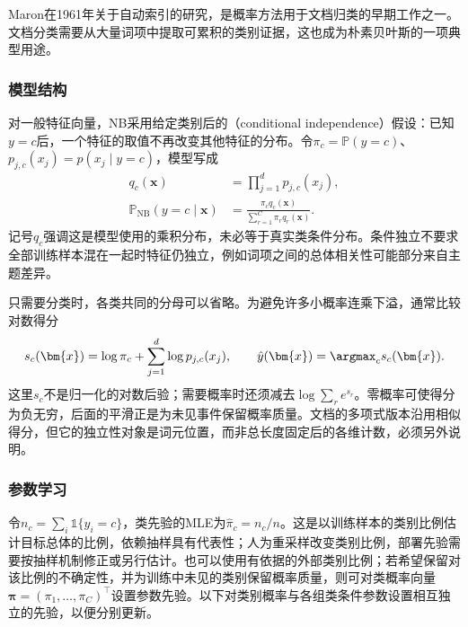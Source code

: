 Maron在1961年关于自动索引的研究，是概率方法用于文档归类的早期工作之一。文档分类需要从大量词项中提取可累积的类别证据，这也成为朴素贝叶斯的一项典型用途。

\subsubsection{模型结构}
\label{sec:classification-naive-bayes-structure}

对一般特征向量，NB采用给定类别后的（conditional independence）假设：已知$y=c$后，一个特征的取值不再改变其他特征的分布。令$\pi_c=\mathbb{P}(y=c)$、$p_{j,c}(x_j)=p(x_j\mid y=c)$，模型写成
\begin{equation}
  \label{eq:classification-naive-bayes-model}
  \begin{aligned}
    q_c(\bm{x})&=\prod_{j=1}^{d}p_{j,c}(x_j),\\
    \mathbb{P}_{\mathrm{NB}}(y=c\mid\bm{x})
      &=\frac{\pi_c q_c(\bm{x})}
      {\sum_{r=1}^{C}\pi_r q_r(\bm{x})}.
  \end{aligned}
\end{equation}
记号$q_c$强调这是模型使用的乘积分布，未必等于真实类条件分布。条件独立不要求全部训练样本混在一起时特征仍独立，例如词项之间的总体相关性可能部分来自主题差异。

只需要分类时，各类共同的分母可以省略。为避免许多小概率连乘下溢，通常比较对数得分
\begin{equation}
  \label{eq:classification-naive-bayes-score}
  s_c(\bm{x})
  =\log\pi_c+\sum_{j=1}^{d}\log p_{j,c}(x_j),
  \qquad
  \hat y(\bm{x})=\argmax_c s_c(\bm{x}).
\end{equation}
这里$s_c$不是归一化的对数后验；需要概率时还须减去$\log\sum_r e^{s_r}$。零概率可使得分为负无穷，后面的平滑正是为未见事件保留概率质量。文档的多项式版本沿用相似得分，但它的独立性对象是词元位置，而非总长度固定后的各维计数，必须另外说明。

\subsubsection{参数学习}
\label{sec:classification-naive-bayes-learning}

令$n_c=\sum_i\mathbb{1}\{y_i=c\}$，类先验的MLE为$\hat\pi_c=n_c/n$。这是以训练样本的类别比例估计目标总体的比例，依赖抽样具有代表性；人为重采样改变类别比例，部署先验需要按抽样机制修正或另行估计。也可以使用有依据的外部类别比例；若希望保留对该比例的不确定性，并为训练中未见的类别保留概率质量，则可对类概率向量$\bm{\pi}=(\pi_1,\ldots,\pi_C)^{\top}$设置参数先验。以下对类别概率与各组类条件参数设置相互独立的先验，以便分别更新。

